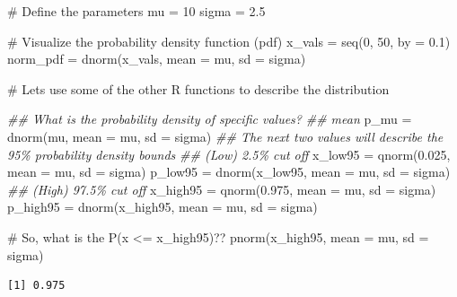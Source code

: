 \documentclass[
  letterpaper,
  DIV=11,
  numbers=noendperiod]{scrreprt}
\newenvironment{Shaded}{\begin{snugshade}}{\end{snugshade}}
\newcommand{\AttributeTok}[1]{\textcolor[rgb]{0.40,0.45,0.13}{#1}}
\newcommand{\CommentTok}[1]{\textcolor[rgb]{0.37,0.37,0.37}{#1}}
\newcommand{\DecValTok}[1]{\textcolor[rgb]{0.68,0.00,0.00}{#1}}
\newcommand{\DocumentationTok}[1]{\textcolor[rgb]{0.37,0.37,0.37}{\textit{#1}}}
\newcommand{\FloatTok}[1]{\textcolor[rgb]{0.68,0.00,0.00}{#1}}
\newcommand{\FunctionTok}[1]{\textcolor[rgb]{0.28,0.35,0.67}{#1}}
\newcommand{\NormalTok}[1]{\textcolor[rgb]{0.00,0.23,0.31}{#1}}
\newcommand{\OtherTok}[1]{\textcolor[rgb]{0.00,0.23,0.31}{#1}}
\begin{document}
\begin{Shaded}
\begin{Highlighting}[]
\CommentTok{\# Define the parameters}
\NormalTok{mu }\OtherTok{=} \DecValTok{10}
\NormalTok{sigma }\OtherTok{=} \FloatTok{2.5}

\CommentTok{\# Visualize the probability density function (pdf)}
\NormalTok{x\_vals }\OtherTok{=} \FunctionTok{seq}\NormalTok{(}\DecValTok{0}\NormalTok{, }\DecValTok{50}\NormalTok{, }\AttributeTok{by =} \FloatTok{0.1}\NormalTok{)}
\NormalTok{norm\_pdf }\OtherTok{=} \FunctionTok{dnorm}\NormalTok{(x\_vals, }\AttributeTok{mean =}\NormalTok{ mu, }\AttributeTok{sd =}\NormalTok{ sigma)}

\CommentTok{\# Let\textquotesingle{}s use some of the other R functions to describe the distribution}

\DocumentationTok{\#\# What is the probability density of specific values?}
\DocumentationTok{\#\# mean}
\NormalTok{p\_mu }\OtherTok{=} \FunctionTok{dnorm}\NormalTok{(mu, }\AttributeTok{mean =}\NormalTok{ mu, }\AttributeTok{sd =}\NormalTok{ sigma)}
\DocumentationTok{\#\# The next two values will describe the 95\% probability density bounds}
\DocumentationTok{\#\# (Low) 2.5\% cut off }
\NormalTok{x\_low95 }\OtherTok{=} \FunctionTok{qnorm}\NormalTok{(}\FloatTok{0.025}\NormalTok{, }\AttributeTok{mean =}\NormalTok{ mu, }\AttributeTok{sd =}\NormalTok{ sigma)}
\NormalTok{p\_low95 }\OtherTok{=} \FunctionTok{dnorm}\NormalTok{(x\_low95, }\AttributeTok{mean =}\NormalTok{ mu, }\AttributeTok{sd =}\NormalTok{ sigma)}
\DocumentationTok{\#\# (High) 97.5\% cut off}
\NormalTok{x\_high95 }\OtherTok{=} \FunctionTok{qnorm}\NormalTok{(}\FloatTok{0.975}\NormalTok{, }\AttributeTok{mean =}\NormalTok{ mu, }\AttributeTok{sd =}\NormalTok{ sigma)}
\NormalTok{p\_high95 }\OtherTok{=} \FunctionTok{dnorm}\NormalTok{(x\_high95, }\AttributeTok{mean =}\NormalTok{ mu, }\AttributeTok{sd =}\NormalTok{ sigma)}

\CommentTok{\# So, what is the P(x \textless{}= x\_high95)??}
\FunctionTok{pnorm}\NormalTok{(x\_high95, }\AttributeTok{mean =}\NormalTok{ mu, }\AttributeTok{sd =}\NormalTok{ sigma)}
\end{Highlighting}
\end{Shaded}

\begin{verbatim}
[1] 0.975
\end{verbatim}
\end{document}

